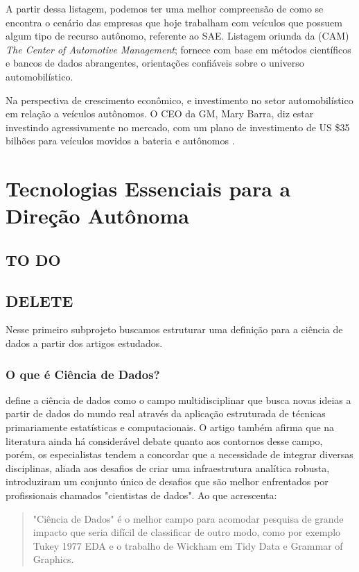 A partir dessa listagem, podemos ter uma melhor compreensão de como se encontra o cenário das empresas que hoje trabalham com veículos que possuem algum tipo de recurso autônomo, referente ao SAE. Listagem oriunda da (CAM) \textit{The Center of Automotive Management}; fornece com base em métodos científicos e bancos de dados abrangentes, orientações confiáveis sobre o universo automobilístico.

\vspace {1cm}

Na perspectiva de crescimento econômico, e investimento no setor automobilístico em relação a veículos autônomos. O CEO da GM, Mary Barra, diz estar investindo agressivamente no mercado, com um plano de investimento de US \$35 bilhões para veículos movidos a bateria e autônomos \cite{gm}.



\section{Tecnologias Essenciais para a Direção Autônoma}


\subsection{TO DO}



\subsection{DELETE}
Nesse primeiro subprojeto buscamos estruturar uma definição para a ciência de dados a partir dos artigos estudados. 

\subsubsection{O que é Ciência de Dados?}
\cite{BATON} define a ciência de dados como o campo multidisciplinar que busca novas ideias a partir de dados do mundo real através da aplicação estruturada de técnicas primariamente estatísticas e computacionais. 
O artigo também afirma que na literatura ainda há considerável debate quanto aos contornos desse campo, porém, os especialistas tendem a concordar que a necessidade de integrar diversas disciplinas, aliada aos desafios de criar uma infraestrutura analítica robusta, introduziram um conjunto único de desafios que são melhor enfrentados por profissionais chamados "cientistas de dados". Ao que \cite{DONOHO} acrescenta:
\begin{quote}
"Ciência de Dados" é o melhor campo para acomodar pesquisa de grande impacto que seria difícil de classificar de outro modo, como por exemplo Tukey 1977 EDA e o trabalho de Wickham em Tidy Data e Grammar of Graphics.
\end{quote}

